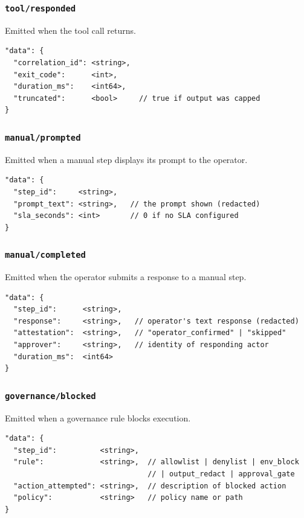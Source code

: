 \subsubsection{\texttt{tool/responded}}

Emitted when the tool call returns.

\begin{verbatim}
"data": {
  "correlation_id": <string>,
  "exit_code":      <int>,
  "duration_ms":    <int64>,
  "truncated":      <bool>     // true if output was capped
}
\end{verbatim}

\subsubsection{\texttt{manual/prompted}}

Emitted when a manual step displays its prompt to the operator.

\begin{verbatim}
"data": {
  "step_id":     <string>,
  "prompt_text": <string>,   // the prompt shown (redacted)
  "sla_seconds": <int>       // 0 if no SLA configured
}
\end{verbatim}

\subsubsection{\texttt{manual/completed}}

Emitted when the operator submits a response to a manual step.

\begin{verbatim}
"data": {
  "step_id":      <string>,
  "response":     <string>,   // operator's text response (redacted)
  "attestation":  <string>,   // "operator_confirmed" | "skipped"
  "approver":     <string>,   // identity of responding actor
  "duration_ms":  <int64>
}
\end{verbatim}

\subsubsection{\texttt{governance/blocked}}

Emitted when a governance rule blocks execution.

\begin{verbatim}
"data": {
  "step_id":          <string>,
  "rule":             <string>,  // allowlist | denylist | env_block
                                 // | output_redact | approval_gate
  "action_attempted": <string>,  // description of blocked action
  "policy":           <string>   // policy name or path
}
\end{verbatim}

